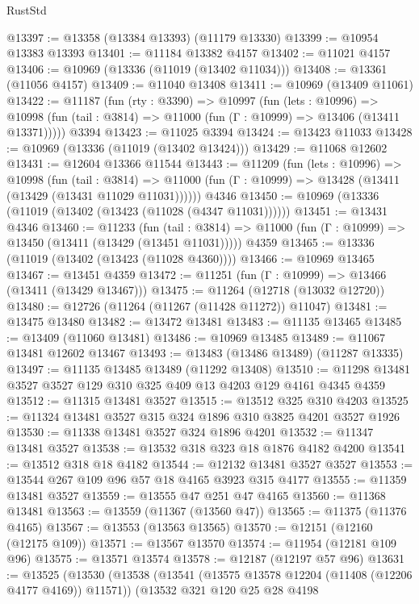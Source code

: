 \begin{lexlean}{RustStd}
\begin{coremodule}
@13397 := @13358 (@13384 @13393) (@11179 @13330)
@13399 := @10954 @13383 @13393
@13401 := @11184 @13382 @4157
@13402 := @11021 @4157
@13406 := @10969 (@13336 (@11019 (@13402 @11034)))
@13408 := @13361 (@11056 @4157)
@13409 := @11040 @13408
@13411 := @10969 (@13409 @11061)
@13422 := @11187
    (fun (rty : @3390) =>
    @10997
      (fun (lets : @10996) =>
      @10998 (fun (tail : @3814) => @11000 (fun (Γ : @10999) => @13406 (@13411 @13371)))))
    @3394
@13423 := @11025 @3394
@13424 := @13423 @11033
@13428 := @10969 (@13336 (@11019 (@13402 @13424)))
@13429 := @11068 @12602
@13431 := @12604 @13366 @11544
@13443 := @11209
    (fun (lets : @10996) =>
    @10998
      (fun (tail : @3814) =>
      @11000 (fun (Γ : @10999) => @13428 (@13411 (@13429 (@13431 @11029 @11031))))))
    @4346
@13450 := @10969 (@13336 (@11019 (@13402 (@13423 (@11028 (@4347 @11031))))))
@13451 := @13431 @4346
@13460 := @11233
    (fun (tail : @3814) => @11000 (fun (Γ : @10999) => @13450 (@13411 (@13429 (@13451 @11031)))))
    @4359
@13465 := @13336 (@11019 (@13402 (@13423 (@11028 @4360))))
@13466 := @10969 @13465
@13467 := @13451 @4359
@13472 := @11251 (fun (Γ : @10999) => @13466 (@13411 (@13429 @13467)))
@13475 := @11264 (@12718 (@13032 @12720))
@13480 := @12726 (@11264 (@11267 (@11428 @11272)) @11047)
@13481 := @13475 @13480
@13482 := @13472 @13481
@13483 := @11135 @13465
@13485 := @13409 (@11060 @13481)
@13486 := @10969 @13485
@13489 := @11067 @13481 @12602 @13467
@13493 := @13483 (@13486 @13489) (@11287 @13335)
@13497 := @11135 @13485 @13489 (@11292 @13408)
@13510 := @11298 @13481 @3527 @3527 @129 @310 @325 @409 @13 @4203 @129 @4161 @4345 @4359
@13512 := @11315 @13481 @3527
@13515 := @13512 @325 @310 @4203
@13525 := @11324 @13481 @3527 @315 @324 @1896 @310 @3825 @4201 @3527 @1926
@13530 := @11338 @13481 @3527 @324 @1896 @4201
@13532 := @11347 @13481 @3527
@13538 := @13532 @318 @323 @18 @1876 @4182 @4200
@13541 := @13512 @318 @18 @4182
@13544 := @12132 @13481 @3527 @3527
@13553 := @13544 @267 @109 @96 @57 @18 @4165 @3923 @315 @4177
@13555 := @11359 @13481 @3527
@13559 := @13555 @47 @251 @47 @4165
@13560 := @11368 @13481
@13563 := @13559 (@11367 (@13560 @47))
@13565 := @11375 (@11376 @4165)
@13567 := @13553 (@13563 @13565)
@13570 := @12151 (@12160 (@12175 @109))
@13571 := @13567 @13570
@13574 := @11954 (@12181 @109 @96)
@13575 := @13571 @13574
@13578 := @12187 (@12197 @57 @96)
@13631 := @13525
    (@13530
      (@13538
        (@13541 (@13575 @13578 @12204 (@11408 (@12206 @4177 @4169)) @11571))
        (@13532
          @321
          @120
          @25
          @28
          @4198

\end{coremodule}
\end{lexlean}
